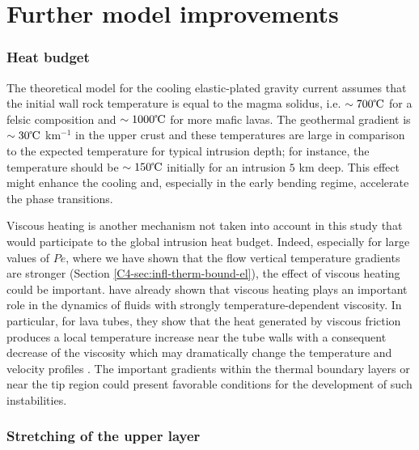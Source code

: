 \section{Further model improvements}
\label{sec:generalization-model}

\subsubsection*{Heat budget}
\label{subsubsection}

The theoretical  model for the cooling  elastic-plated gravity current
assumes that the  initial wall rock temperature is equal  to the magma
solidus,  i.e.   $\sim 700  \celsius$  for  a felsic  composition  and
$\sim 1000 \celsius$ for more mafic lavas.  The geothermal gradient is
$\sim 30 \celsius$ km$^{-1}$ in the upper crust and these temperatures
are  large  in comparison  to  the  expected temperature  for  typical
intrusion   depth;   for   instance,   the   temperature   should   be
$\sim  150 \celsius$  initially for  an intrusion  $5$ km  deep.  This
effect might enhance the cooling  and, especially in the early bending
regime, accelerate the phase transitions.

Viscous heating  is another mechanism  not taken into account  in this
study   that  would   participate   to  the   global  intrusion   heat
budget. Indeed,  especially for  large values of  $Pe$, where  we have
shown  that  the  flow  vertical  temperature  gradients  are  stronger
(Section  \ref{C4-sec:infl-therm-bound-el}),  the  effect  of  viscous
heating could  be important.  \citet{Costa:2005bq} have  already shown
that viscous heating plays an important role in the dynamics of fluids
with strongly temperature-dependent viscosity. In particular, for lava
tubes, they show that the  heat generated by viscous friction produces
a local  temperature increase  near the tube  walls with  a consequent
decrease  of   the  viscosity   which  may  dramatically   change  the
temperature             and              velocity             profiles
\citep{Costa:2002cj,Costa:2003wk,Costa:2005bq}.      The     important
gradients within  the thermal boundary  layers or near the  tip region
could  present  favorable  conditions  for  the  development  of  such
instabilities.

\subsubsection*{Stretching of the upper layer}
\label{subsubsection}

